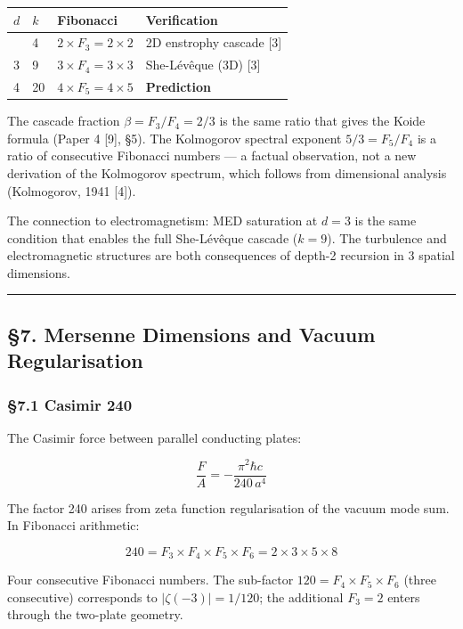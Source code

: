 \documentclass[
  11pt,
  a4paper]{article}
\begin{document}
\begin{longtable}[]{@{}llll@{}}
\toprule\noalign{}
\(d\) & \(k\) & Fibonacci & Verification \\
\midrule\noalign{}
\endhead
\bottomrule\noalign{}
\endlastfoot
2 & 4 & \(2 \times F_3 = 2 \times 2\) & 2D enstrophy cascade {[}3{]} \\
3 & 9 & \(3 \times F_4 = 3 \times 3\) & She-Lévêque (3D) {[}3{]} \\
4 & 20 & \(4 \times F_5 = 4 \times 5\) & \textbf{Prediction} \\
\end{longtable}

The cascade fraction \(\beta = F_3/F_4 = 2/3\) is the same ratio that
gives the Koide formula (Paper 4 {[}9{]}, §5). The Kolmogorov spectral
exponent \(5/3 = F_5/F_4\) is a ratio of consecutive Fibonacci numbers
--- a factual observation, not a new derivation of the Kolmogorov
spectrum, which follows from dimensional analysis (Kolmogorov, 1941
{[}4{]}).

The connection to electromagnetism: MED saturation at \(d = 3\) is the
same condition that enables the full She-Lévêque cascade (\(k = 9\)).
The turbulence and electromagnetic structures are both consequences of
depth-2 recursion in 3 spatial dimensions.

\begin{center}\rule{0.5\linewidth}{0.5pt}\end{center}

\subsection{§7. Mersenne Dimensions and Vacuum
Regularisation}\label{mersenne-dimensions-and-vacuum-regularisation}

\subsubsection{§7.1 Casimir 240}\label{casimir-240}

The Casimir force between parallel conducting plates:

\[\frac{F}{A} = -\frac{\pi^2 \hbar c}{240\,a^4}\]

The factor 240 arises from zeta function regularisation of the vacuum
mode sum. In Fibonacci arithmetic:

\[240 = F_3 \times F_4 \times F_5 \times F_6 = 2 \times 3 \times 5 \times 8\]

Four consecutive Fibonacci numbers. The sub-factor
\(120 = F_4 \times F_5 \times F_6\) (three consecutive) corresponds to
\(|\zeta(-3)| = 1/120\); the additional \(F_3 = 2\) enters through the
two-plate geometry.
\end{document}
